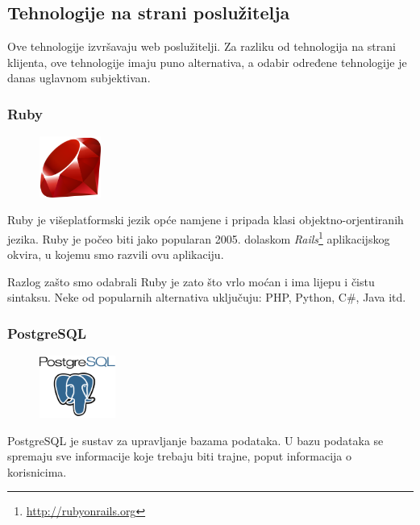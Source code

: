 \documentclass{scrreprt}
\begin{document}
\subsection{Tehnologije na strani poslužitelja}

Ove tehnologije izvršavaju web poslužitelji. Za razliku od tehnologija na
strani klijenta, ove tehnologije imaju puno alternativa, a odabir određene
tehnologije je danas uglavnom subjektivan.

\subsubsection{Ruby}

\begin{figure}
  \vspace{-10pt}
  \includegraphics[width=2cm]{logos/ruby}
  \vspace{-20pt}
\end{figure}

Ruby je višeplatformski jezik opće namjene i pripada klasi objektno-orjentiranih
jezika. Ruby je počeo biti jako popularan 2005. dolaskom
\emph{Rails}\footnote{\url{http://rubyonrails.org}} aplikacijskog okvira, u
kojemu smo razvili ovu aplikaciju.\cite{ruby}

Razlog zašto smo odabrali Ruby je zato što vrlo moćan i ima lijepu i čistu
sintaksu. Neke od popularnih alternativa uključuju: PHP, Python, C\#, Java itd.

\subsubsection{PostgreSQL}

\begin{figure}
  \vspace{-10pt}
  \includegraphics[width=2.5cm]{logos/postgresql}
  \vspace{-30pt}
\end{figure}

PostgreSQL je sustav za upravljanje bazama podataka. U bazu podataka se spremaju
sve informacije koje trebaju biti trajne, poput informacija o
korisnicima.\cite{postgresql}
\end{document}
